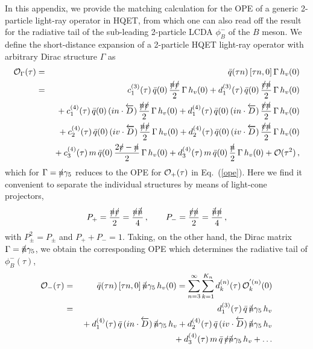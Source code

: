 \documentclass[a4paper,11pt]{article}
\begin{document}
In this appendix, we provide the matching calculation for the OPE of a generic 2-particle light-ray operator in HQET, from which one can also read off the 
result for the radiative tail of the sub-leading 2-particle LCDA $\phi_B^-$ of the $B$ meson.
%
We define the short-distance expansion of a 2-particle HQET light-ray operator with arbitrary 
Dirac structure $\Gamma$ as
\begin{eqnarray}
{\cal O}_\Gamma(\tau)& = & \bar q(\tau n) \left[\tau n,0\right] \Gamma \, h_v(0) 
	\cr 
 &=& 
  c_{1}^{(3)}(\tau) \, \bar q(0) \, \frac{\slashed n \slashed v}{2} \, \Gamma \, h_v(0)  
  + d_{1}^{(3)}(\tau) \, \bar q(0) \, \frac{\slashed v \slashed n}{2} \, \Gamma \, h_v(0)  
%	
	\cr && {} 
 + c_{1}^{(4)}(\tau) \, \bar q(0) \, (i n \cdot \overleftarrow{D}) \, \frac{\slashed n \slashed v}{2} \, \Gamma \, h_v(0)
 + d_{1}^{(4)}(\tau) \, \bar q(0) \, (i n \cdot \overleftarrow{D}) \, \frac{\slashed v \slashed n}{2} \, \Gamma \, h_v(0)
 \cr && {}
 + c_{2}^{(4)}(\tau) \, \bar q(0) \, (i v \cdot \overleftarrow{D}) \, \frac{\slashed n \slashed v}{2} \, \Gamma \, h_v(0)
 + d_{2}^{(4)}(\tau) \, \bar q(0) \, (i v \cdot \overleftarrow{D}) \, \frac{\slashed v \slashed n}{2} \, \Gamma \, h_v(0)
 \cr && {}
	   + c_{3}^{(4)}(\tau) \, m \, \bar q(0) \, \frac{2\slashed v- \slashed n}{2} \, \Gamma \, h_v(0)
       + d_{3}^{(4)}(\tau) \, m \, \bar q(0) \, \frac{\slashed n}{2} \, \Gamma \, h_v(0)
    + {\cal O}(\tau^2) \,,
    \label{ope2} 
\end{eqnarray}
which for $\Gamma=\slashed n\gamma_5$ reduces to the OPE for ${\cal O}_+(\tau)$ in 
Eq.~(\ref{ope}). Here we find it convenient to separate the individual structures by means of light-cone projectors,
\begin{eqnarray}
 P_+ = \frac{\slashed n \slashed v}{2} = \frac{\slashed n \slashed {\bar n}}{4} \,, \qquad 
 P_- = \frac{\slashed v \slashed n}{2} = \frac{\slashed {\bar n} \slashed n}{4} \, ,
\end{eqnarray}
with $P_\pm^2 = P_\pm$ and $P_+ + P_- =1$.
%
Taking, on the other hand, the Dirac matrix $\Gamma=\slashed {\bar n}\gamma_5$, we obtain the corresponding OPE which determines the radiative tail of $\phi_B^-(\tau)$,
%
\begin{eqnarray}
{\cal O}_-(\tau) &=&	\bar q(\tau n) \left[\tau n,0\right] \slashed {\bar n}\gamma_5 \, h_v(0) = \sum_{n=3}^\infty \sum_{k=1}^{K_n} d_k^{(n)}(\tau) \, {\cal O}_k^{'(n)}(0)
\cr 
 &=& d_{1}^{(3)}(\tau) \, \bar q \, \slashed {\bar n}\gamma_5 \, h_v  
\cr && {} + d_{1}^{(4)}(\tau) \, \bar q \, (i n \cdot \overleftarrow{D}) \, \slashed {\bar n}\gamma_5 \, h_v
+ d_{2}^{(4)}(\tau) \, \bar q \, (i v \cdot \overleftarrow{D}) \, \slashed {\bar n} \gamma_5 \, h_v 
\cr 
&& {} + d_{3}^{(4)}(\tau) \,  m \, \bar q \, \slashed v \slashed {\bar n} \gamma_5 \, h_v + \ldots
\end{eqnarray}
\end{document}
